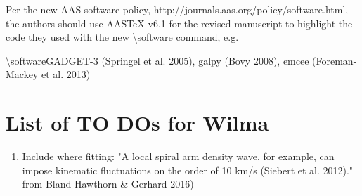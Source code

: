 \documentclass[10pt,a4paper]{article}
\begin{document}
Per the new AAS software policy, http://journals.aas.org/policy/software.html, the
authors should use AASTeX v6.1 for the revised manuscript to highlight the code they
used with the new {\textbackslash}software command, e.g.

{\textbackslash}software{GADGET-3 (Springel et al. 2005), galpy (Bovy 2008), emcee (Foreman-Mackey
et al. 2013)}

\section{List of TO DOs for Wilma}


\begin{enumerate}
\item Include where fitting:  "A local spiral arm
density wave, for example, can impose kinematic fluctuations on the order of 10 km/s (Siebert et al. 2012)." from Bland-Hawthorn \& Gerhard 2016)
\end{enumerate}
\end{document}

